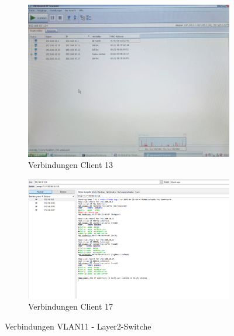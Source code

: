         \begin{figure}[H]\ContinuedFloat
            \centering
            \begin{subfigure}{\linewidth}
                \centering
                \includegraphics[width=\linewidth]{images/Einrichtung Layer2-Switche/ServerVLAN11Client13.jpg}
                \caption{Verbindungen Client 13}
            \end{subfigure}
            \begin{subfigure}{\linewidth}
                \centering
                \includegraphics[width=\linewidth]{images/Einrichtung Layer2-Switche/ServerVLAN11Client17.png}
                \caption{Verbindungen Client 17}
            \end{subfigure}
        \caption{Verbindungen VLAN11 - Layer2-Switche}
        \end{figure}



